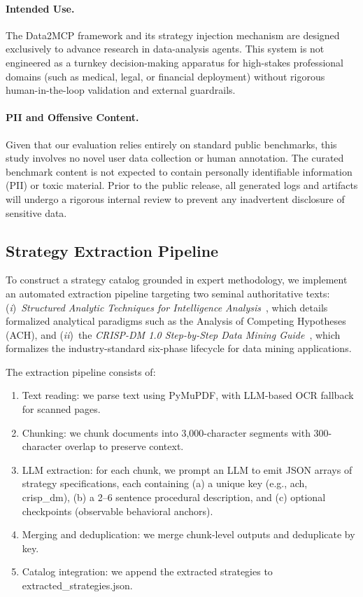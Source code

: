 \paragraph{Intended Use.}
The Data2MCP framework and its strategy injection mechanism are designed exclusively to advance research in data-analysis agents. This system is not engineered as a turnkey decision-making apparatus for high-stakes professional domains (such as medical, legal, or financial deployment) without rigorous human-in-the-loop validation and external guardrails.

\paragraph{PII and Offensive Content.}
Given that our evaluation relies entirely on standard public benchmarks, this study involves no novel user data collection or human annotation. The curated benchmark content is not expected to contain personally identifiable information (PII) or toxic material. Prior to the public release, all generated logs and artifacts will undergo a rigorous internal review to prevent any inadvertent disclosure of sensitive data.

\subsection{Strategy Extraction Pipeline}
\label{app:extraction}

To construct a strategy catalog grounded in expert methodology, we implement an automated extraction pipeline targeting two seminal authoritative texts: (\emph{i})~\emph{Structured Analytic Techniques for Intelligence Analysis}~\cite{heuer2010structured}, which details formalized analytical paradigms such as the Analysis of Competing Hypotheses (ACH), and (\emph{ii})~the \emph{CRISP-DM 1.0 Step-by-Step Data Mining Guide}~\cite{crispdm2000}, which formalizes the industry-standard six-phase lifecycle for data mining applications.

The extraction pipeline consists of:
\begin{enumerate}
  \item Text reading: we parse text using PyMuPDF, with LLM-based OCR fallback for scanned pages.
  \item Chunking: we chunk documents into 3,000-character segments with 300-character overlap to preserve context.
  \item LLM extraction: for each chunk, we prompt an LLM to emit JSON arrays of strategy specifications, each containing (a) a unique key (e.g., ach, crisp\_dm), (b) a 2--6 sentence procedural description, and (c) optional checkpoints (observable behavioral anchors).
  \item Merging and deduplication: we merge chunk-level outputs and deduplicate by key.
  \item Catalog integration: we append the extracted strategies to extracted\_strategies.json.
\end{enumerate}


